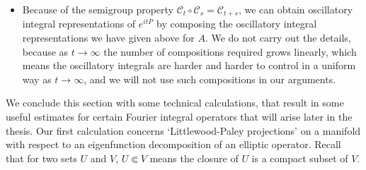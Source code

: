 \begin{itemize}
  \item Because of the semigroup property $\mathcal{C}_t \circ \mathcal{C}_s = \mathcal{C}_{t+s}$, we can obtain oscillatory integral representations of $e^{i t P}$ by composing the oscillatory integral representations we have given above for $A$. We do not carry out the details, because as $t \to \infty$ the number of compositions required grows linearly, which means the oscillatory integrals are harder and harder to control in a uniform way as $t \to \infty$, and we will not use such compositions in our arguments.
\end{itemize}
%
We conclude this section with some technical calculations, that result in some useful estimates for certain Fourier integral operators that will arise later in the thesis. Our first calculation concerns `Littlewood-Paley projections' on a manifold with respect to an eigenfunction decomposition of an elliptic operator. Recall that for two sets $U$ and $V$, $U \Subset V$ means the closure of $U$ is a compact subset of $V$.

